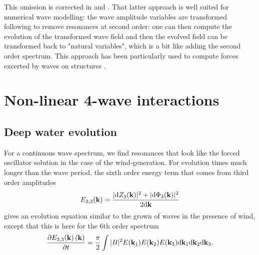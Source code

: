 This omission is corrected in \cite{Creamer&al.1989} and \cite{Janssen2009}. That latter approach is well suited for numerical wave modelling: the wave amplitude variables are transformed following  \cite{Krasitskii1994} to remove resonances at second order: one can then compute the evolution of the transformed wave field and then the evolved field can be transformed back to "natural variables", which is a bit like adding the second order spectrum.
This approach has been particularly used to compute forces excerted by waves on structures 
\citep{Prevosto&Forristall2002}. 


\section{Non-linear 4-wave interactions}
\subsection{Deep water evolution}
For a continuous wave spectrum, we find resonances that look like the forced oscillator solution in the case of the wind-generation. %
For evolution times much longer than the wave period, the sixth order energy term that comes from third order amplitudes 
\begin{equation}
E_{3,3}(\mathbf{k})=\frac{|\mathrm{d} Z_3(\mathbf{k})|^2 + |\mathrm{d} \Phi_3(\mathbf{k})|^2}{2 \mathrm{d} \mathbf{k}}
\end{equation}
gives an evolution equation similar to the grown of waves in the presence of wind, except that this is here for the 6th order spectrum %
\begin{equation}
\frac{\partial E_{3,3}(\mathbf{k}) \left(\mathbf{k} \right)}{\partial t} = \frac{\pi}{2}  \int |B|^2 E(\mathbf{k}_1) E (\mathbf{k}_2) 
E (\mathbf{k}_3){\mathrm d}\mathbf{k}_1{\mathrm d}\mathbf{k}_2{\mathrm d}\mathbf{k}_3.\label{E33}
\end{equation}

